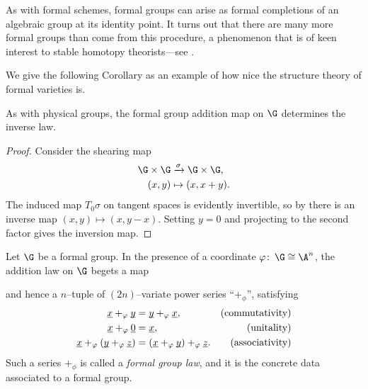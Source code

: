 \begin{remark}
As with formal schemes, formal groups can arise as formal completions of an algebraic group at its identity point.  It turns out that there are many more formal groups than come from this procedure, a phenomenon that is of keen interest to stable homotopy theorists---see .
\end{remark}

We give the following Corollary as an example of how nice the structure theory of formal varieties is.

\begin{corollary}
As with physical groups, the formal group addition map on $\G$ determines the inverse law.
\end{corollary}
\begin{proof}
Consider the shearing map
\begin{align*}
\G \times \G & \xrightarrow{\sigma} \G \times \G, \\
(x, y) & \mapsto (x, x + y).
\end{align*}
The induced map $T_0 \sigma$ on tangent spaces is evidently invertible, so by  there is an inverse map $(x, y) \mapsto (x, y - x)$.  Setting $y = 0$ and projecting to the second factor gives the inversion map.
\end{proof}



\begin{definition}\label{FGLDefinition}
Let $\G$ be a formal group.  In the presence of a coordinate $\phi \co \G \cong \A^n$, the addition law on $\G$ begets a map
\begin{center}
\end{center}
and hence a $n$--tuple of $(2n)$--variate power series ``$+_\phi$'', satisfying
\begin{align*}
\underline{\smash x} +_\phi \underline{\smash y} & = \underline{\smash y} +_\phi \underline{\smash x}, & \text{(commutativity)} \\
\underline{\smash x} +_\phi \underline{\smash 0} & = \underline{\smash x}, & \text{(unitality)} \\
\underline{\smash x} +_\phi (\underline{\smash y} +_\phi \underline{\smash z}) & = (\underline{\smash x} +_\phi \underline{\smash y}) +_\phi \underline{\smash z}. & \text{(associativity)}
\end{align*}
Such a series $+_\phi$ is called a \textit{formal group law}, and it is the concrete data associated to a formal group.
\end{definition}


